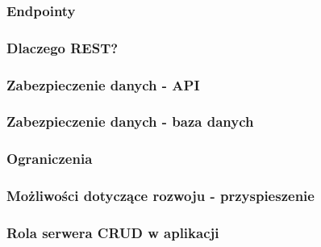 \subsubsection{Endpointy}
\subsubsection{Dlaczego REST?}
\subsubsection{Zabezpieczenie danych - API}
\subsubsection{Zabezpieczenie danych - baza danych}
\subsubsection{Ograniczenia}
\subsubsection{Możliwości dotyczące rozwoju - przyspieszenie}
\subsubsection{Rola serwera CRUD w aplikacji}